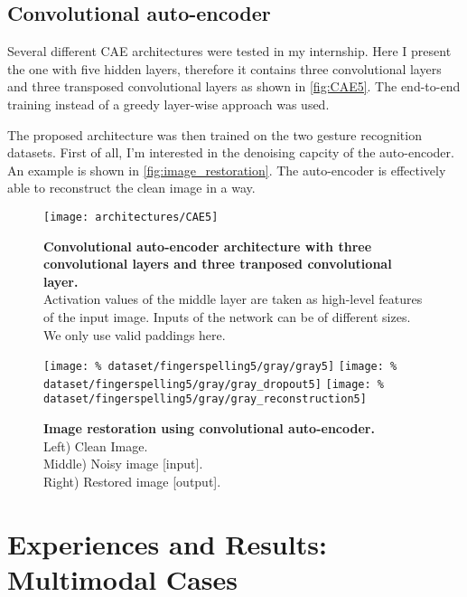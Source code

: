 \subsection{Convolutional auto-encoder} \label{subsection:CAE}

Several different CAE architectures were tested in my internship.
Here I present the one with five hidden layers, therefore it contains
three convolutional layers and three transposed convolutional layers
as shown in \autoref{fig:CAE5}. The end-to-end training instead of
a greedy layer-wise approach was used.

The proposed architecture was then trained on the two gesture recognition
datasets. First of all, I'm interested in the denoising capcity of
the auto-encoder. An example is shown in \autoref{fig:image_restoration}.
The auto-encoder is effectively able to reconstruct the clean image in
a way.

\begin{figure}[H]
  \centering
  \texttt{[image: architectures/CAE5]}
  \caption{%
    \textbf{Convolutional auto-encoder architecture with 
      three convolutional layers and three tranposed convolutional
      layer.}\\[0.1em]
    Activation values of the middle layer are taken as 
      high-level features of the input image. Inputs of the network
      can be of different sizes. We only use valid paddings here.}
  \label{fig:CAE5}
\end{figure}

\begin{figure}[H]
  \centering
  \hfill
  \texttt{[image: \%
    dataset/fingerspelling5/gray/gray5]}
  \hfill
  \texttt{[image: \%
    dataset/fingerspelling5/gray/gray\_dropout5]}
  \hfill
  \texttt{[image: \%
    dataset/fingerspelling5/gray/gray\_reconstruction5]}
  \caption{%
    \textbf{Image restoration using convolutional auto-encoder.}\\[0.1em]
      Left) Clean Image.\\[0.1em]
      Middle) Noisy image [input].\\[0.1em]
      Right) Restored image [output].}
  \label{fig:image_restoration}
\end{figure}

\section{Experiences and Results: Multimodal Cases}

